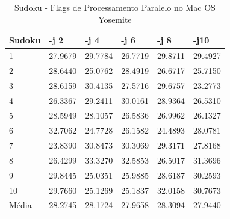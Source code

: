 \begin{table}[!ht]
\centering
\tiny
\caption{Sudoku - Flags de Processamento Paralelo no Mac OS Yosemite}
\label{tab:flag_processamento_paralelo:mac:sudoku}
\begin{tabular}{llllll}
\textbf{Sudoku} & \textbf{-j 2} & \textbf{-j 4} & \textbf{-j 6} & \textbf{-j 8} & \textbf{-j10}  \\ \toprule
1               & 27.9679 & 29.7784 & 26.7719 & 29.8711 & 29.4927   \\ 
2               & 28.6440 & 25.0762 & 28.4919 & 26.6717 & 25.7150   \\ 
3               & 28.6159 & 30.4135 & 27.5716 & 29.6757 & 23.2773   \\ 
4               & 26.3367 & 29.2411 & 30.0161 & 28.9364 & 26.5310   \\ 
5               & 28.5949 & 28.1057 & 26.5836 & 26.9962 & 26.1327   \\ 
6               & 32.7062 & 24.7728 & 26.1582 & 24.4893 & 28.0781   \\ 
7               & 23.8390 & 30.8473 & 30.3069 & 29.3171 & 27.8168   \\ 
8               & 26.4299 & 33.3270 & 32.5853 & 26.5017 & 31.3696   \\ 
9               & 29.8445 & 25.0351 & 25.9885 & 28.6187 & 30.2593   \\ 
10              & 29.7660 & 25.1269 & 25.1837 & 32.0158 & 30.7673   \\ \bottomrule
Média           & 28.2745 & 28.1724 & 27.9658 & 28.3094 & 27.9440   \\ 
\end{tabular}
\end{table}

